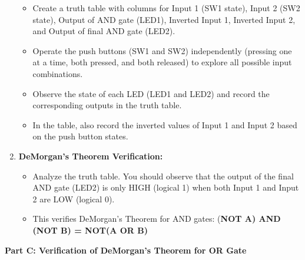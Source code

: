 \begin{enumerate}
    \begin{itemize}
        \item Create a truth table with columns for Input 1 (SW1 state), Input 2 (SW2 state), Output of AND gate (LED1), Inverted Input 1, Inverted Input 2, and Output of final AND gate (LED2).
        \item Operate the push buttons (SW1 and SW2) independently (pressing one at a time, both pressed, and both released) to explore all possible input combinations.
        \item Observe the state of each LED (LED1 and LED2) and record the corresponding outputs in the truth table.
        \item In the table, also record the inverted values of Input 1 and Input 2 based on the push button states.
    \end{itemize}

    \item \textbf{DeMorgan's Theorem Verification:}
    \begin{itemize}
        \item Analyze the truth table. You should observe that the output of the final AND gate (LED2) is only HIGH (logical 1) when both Input 1 and Input 2 are LOW (logical 0).
        \item This verifies DeMorgan's Theorem for AND gates: (\textbf{NOT A) AND (NOT B) = NOT(A OR B)}

    \end{itemize}
\end{enumerate}

\noindent \textbf{Part C: Verification of DeMorgan's Theorem for OR Gate}

